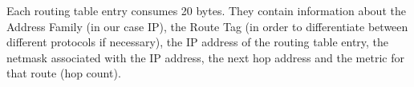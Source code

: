 Each routing table entry consumes 20 bytes. They contain information about the Address Family (in our case IP), the Route Tag (in order to differentiate between different protocols if necessary), the IP address of the routing table entry, the netmask associated with the IP address, the next hop address and the metric for that route (hop count).